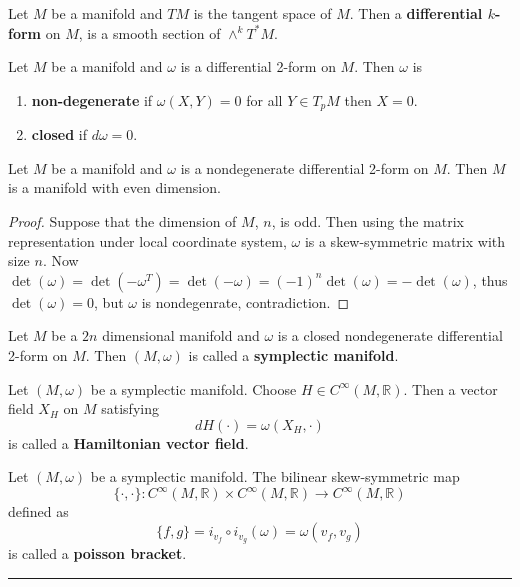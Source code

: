 \begin{defn} Let $M$ be a manifold and $TM$ is the tangent space of $M$. Then a \textbf{differential $k$-form} on $M$, is a smooth section of $\wedge^k T^*M$.
\end{defn}

\begin{defn} Let $M$ be a manifold and $\omega$ is a differential 2-form on $M$. Then $\omega$ is
\begin{enumerate}
\item \textbf{non-degenerate} if $\omega(X,Y)=0$ for all $Y\in T_p M$ then $X=0$.
\item \textbf{closed} if $d\omega=0$.
\end{enumerate}
\end{defn}

\begin{prop} Let $M$ be a manifold and $\omega$ is a nondegenerate differential 2-form on $M$. Then $M$ is a manifold with even dimension.
\end{prop}
\begin{proof} Suppose that the dimension of $M$, $n$, is odd. Then using the matrix representation under local coordinate system, $\omega$ is a skew-symmetric matrix with size $n$. Now $\det(\omega)=\det(-\omega^T)=\det(-\omega)=(-1)^n\det(\omega)=-\det(\omega)$, thus $\det(\omega)=0$, but $\omega$ is nondegenrate, contradiction.
\end{proof}

\begin{defn} Let $M$ be a $2n$ dimensional manifold and $\omega$ is a closed nondegenerate differential 2-form on $M$. Then $(M,\omega)$ is called a \textbf{symplectic manifold}.
\end{defn}

\begin{defn} Let $(M,\omega)$ be a symplectic manifold. Choose $H\in C^\infty (M,\mathbb{R})$. Then a vector field $X_H$ on $M$ satisfying
\begin{equation}
dH(\cdot)=\omega(X_H,\cdot)
\end{equation}
is called a \textbf{Hamiltonian vector field}.
\end{defn}

\begin{defn} Let $(M,\omega)$ be a symplectic manifold. The bilinear skew-symmetric map
\begin{equation}
\{\cdot,\cdot\}:C^\infty(M,\mathbb{R})\times C^\infty(M,\mathbb{R})\rightarrow C^\infty(M,\mathbb{R})
\end{equation}
defined as
\begin{equation}
\{f,g\}=i_{v_f} \circ i_{v_g}(\omega)=\omega(v_f,v_g)
\end{equation}
is called a \textbf{poisson bracket}.
\end{defn}
\noindent\rule{\textwidth}{1pt}
\newline